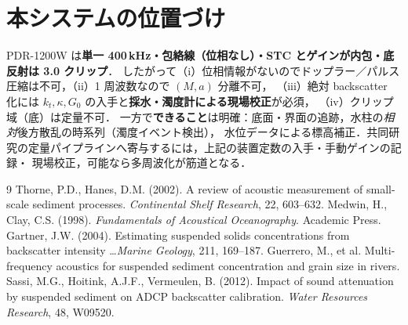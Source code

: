 \documentclass[11pt]{ltjsarticle}
\begin{document}
\section{本システムの位置づけ}
PDR-1200W は\textbf{単一 400\,kHz・包絡線（位相なし）・STC とゲインが内包・底反射は 3.0 クリップ}．
したがって（i）位相情報がないのでドップラー／パルス圧縮は不可，（ii）1 周波数なので $(M,a)$ 分離不可，
（iii）絶対 backscatter 化には $k_t,\kappa,G_0$ の入手と\textbf{採水・濁度計による現場校正}が必須，
（iv）クリップ域（底）は定量不可．
一方で\textbf{できること}は明確：底面・界面の追跡，水柱の\emph{相対}後方散乱の時系列（濁度イベント検出），
水位データによる標高補正．共同研究の定量パイプラインへ寄与するには，上記の装置定数の入手・手動ゲインの記録・
現場校正，可能なら多周波化が筋道となる．

\begin{thebibliography}{9}
 Thorne, P.D., Hanes, D.M. (2002). A review of acoustic measurement of small-scale sediment processes. \emph{Continental Shelf Research}, 22, 603--632.
 Medwin, H., Clay, C.S. (1998). \emph{Fundamentals of Acoustical Oceanography}. Academic Press.
 Gartner, J.W. (2004). Estimating suspended solids concentrations from backscatter intensity \dots \emph{Marine Geology}, 211, 169--187.
 Guerrero, M., et al. Multi-frequency acoustics for suspended sediment concentration and grain size in rivers.
 Sassi, M.G., Hoitink, A.J.F., Vermeulen, B. (2012). Impact of sound attenuation by suspended sediment on ADCP backscatter calibration. \emph{Water Resources Research}, 48, W09520.
\end{thebibliography}
\end{document}
